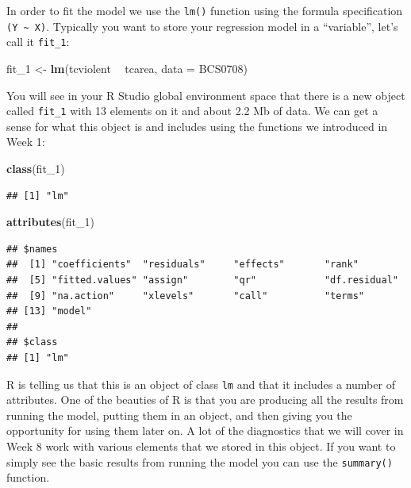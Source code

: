 \documentclass[]{book}
\newenvironment{Shaded}{\begin{snugshade}}{\end{snugshade}}
\newcommand{\DataTypeTok}[1]{\textcolor[rgb]{0.13,0.29,0.53}{#1}}
\newcommand{\DecValTok}[1]{\textcolor[rgb]{0.00,0.00,0.81}{#1}}
\newcommand{\KeywordTok}[1]{\textcolor[rgb]{0.13,0.29,0.53}{\textbf{#1}}}
\newcommand{\NormalTok}[1]{#1}
\newcommand{\OperatorTok}[1]{\textcolor[rgb]{0.81,0.36,0.00}{\textbf{#1}}}
\newcommand{\StringTok}[1]{\textcolor[rgb]{0.31,0.60,0.02}{#1}}
\theoremstyle{definition}
\theoremstyle{definition}
\theoremstyle{definition}
\theoremstyle{remark}
\begin{document}
In order to fit the model we use the \texttt{lm()} function using the
formula specification \texttt{(Y\ \textasciitilde{}\ X)}. Typically you
want to store your regression model in a ``variable'', let's call it
\texttt{fit\_1}:

\begin{Shaded}
\begin{Highlighting}[]
\NormalTok{fit_}\DecValTok{1}\NormalTok{ <-}\StringTok{ }\KeywordTok{lm}\NormalTok{(tcviolent }\OperatorTok{~}\StringTok{ }\NormalTok{tcarea, }\DataTypeTok{data =}\NormalTok{ BCS0708)}
\end{Highlighting}
\end{Shaded}

You will see in your R Studio global environment space that there is a
new object called \texttt{fit\_1} with 13 elements on it and about 2.2
Mb of data. We can get a sense for what this object is and includes
using the functions we introduced in Week 1:

\begin{Shaded}
\begin{Highlighting}[]
\KeywordTok{class}\NormalTok{(fit_}\DecValTok{1}\NormalTok{)}
\end{Highlighting}
\end{Shaded}

\begin{verbatim}
## [1] "lm"
\end{verbatim}

\begin{Shaded}
\begin{Highlighting}[]
\KeywordTok{attributes}\NormalTok{(fit_}\DecValTok{1}\NormalTok{)}
\end{Highlighting}
\end{Shaded}

\begin{verbatim}
## $names
##  [1] "coefficients"  "residuals"     "effects"       "rank"         
##  [5] "fitted.values" "assign"        "qr"            "df.residual"  
##  [9] "na.action"     "xlevels"       "call"          "terms"        
## [13] "model"        
## 
## $class
## [1] "lm"
\end{verbatim}

R is telling us that this is an object of class \texttt{lm} and that it
includes a number of attributes. One of the beauties of R is that you
are producing all the results from running the model, putting them in an
object, and then giving you the opportunity for using them later on. A
lot of the diagnostics that we will cover in Week 8 work with various
elements that we stored in this object. If you want to simply see the
basic results from running the model you can use the \texttt{summary()}
function.
\end{document}
